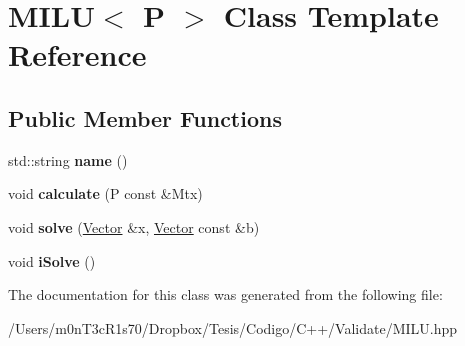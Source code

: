 \hypertarget{class_m_i_l_u}{}\section{M\+I\+LU$<$ P $>$ Class Template Reference}
\label{class_m_i_l_u}
\subsection*{Public Member Functions}
\begin{DoxyCompactItemize}
\item 
\hypertarget{class_m_i_l_u_ab3737e99e275231e9ac8098e1aaa4e23}{}\label{class_m_i_l_u_ab3737e99e275231e9ac8098e1aaa4e23} 
std\+::string {\bfseries name} ()
\item 
\hypertarget{class_m_i_l_u_a6fac385cfccc08bfb5eafeb168f23b70}{}\label{class_m_i_l_u_a6fac385cfccc08bfb5eafeb168f23b70} 
void {\bfseries calculate} (P const \&Mtx)
\item 
\hypertarget{class_m_i_l_u_aea455ae8a322b3961a83ae0f9d355c00}{}\label{class_m_i_l_u_aea455ae8a322b3961a83ae0f9d355c00} 
void {\bfseries solve} (\hyperlink{class_vector}{Vector} \&x, \hyperlink{class_vector}{Vector} const \&b)
\item 
\hypertarget{class_m_i_l_u_a671ecd4a7eaf5de310fe459aad9fa087}{}\label{class_m_i_l_u_a671ecd4a7eaf5de310fe459aad9fa087} 
void {\bfseries i\+Solve} ()
\end{DoxyCompactItemize}


The documentation for this class was generated from the following file\+:\begin{DoxyCompactItemize}
\item 
/\+Users/m0n\+T3c\+R1s70/\+Dropbox/\+Tesis/\+Codigo/\+C++/\+Validate/M\+I\+L\+U.\+hpp\end{DoxyCompactItemize}
